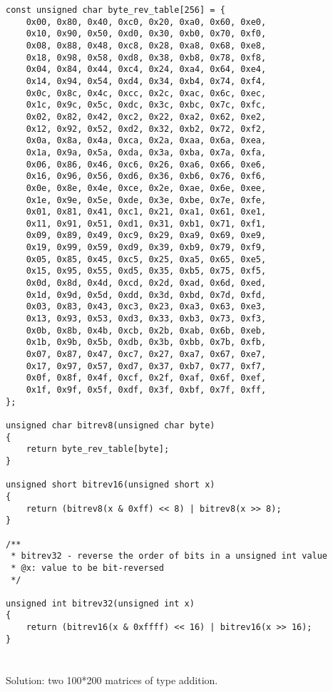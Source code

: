 \begin{lstlisting}
const unsigned char byte_rev_table[256] = {
	0x00, 0x80, 0x40, 0xc0, 0x20, 0xa0, 0x60, 0xe0,
	0x10, 0x90, 0x50, 0xd0, 0x30, 0xb0, 0x70, 0xf0,
	0x08, 0x88, 0x48, 0xc8, 0x28, 0xa8, 0x68, 0xe8,
	0x18, 0x98, 0x58, 0xd8, 0x38, 0xb8, 0x78, 0xf8,
	0x04, 0x84, 0x44, 0xc4, 0x24, 0xa4, 0x64, 0xe4,
	0x14, 0x94, 0x54, 0xd4, 0x34, 0xb4, 0x74, 0xf4,
	0x0c, 0x8c, 0x4c, 0xcc, 0x2c, 0xac, 0x6c, 0xec,
	0x1c, 0x9c, 0x5c, 0xdc, 0x3c, 0xbc, 0x7c, 0xfc,
	0x02, 0x82, 0x42, 0xc2, 0x22, 0xa2, 0x62, 0xe2,
	0x12, 0x92, 0x52, 0xd2, 0x32, 0xb2, 0x72, 0xf2,
	0x0a, 0x8a, 0x4a, 0xca, 0x2a, 0xaa, 0x6a, 0xea,
	0x1a, 0x9a, 0x5a, 0xda, 0x3a, 0xba, 0x7a, 0xfa,
	0x06, 0x86, 0x46, 0xc6, 0x26, 0xa6, 0x66, 0xe6,
	0x16, 0x96, 0x56, 0xd6, 0x36, 0xb6, 0x76, 0xf6,
	0x0e, 0x8e, 0x4e, 0xce, 0x2e, 0xae, 0x6e, 0xee,
	0x1e, 0x9e, 0x5e, 0xde, 0x3e, 0xbe, 0x7e, 0xfe,
	0x01, 0x81, 0x41, 0xc1, 0x21, 0xa1, 0x61, 0xe1,
	0x11, 0x91, 0x51, 0xd1, 0x31, 0xb1, 0x71, 0xf1,
	0x09, 0x89, 0x49, 0xc9, 0x29, 0xa9, 0x69, 0xe9,
	0x19, 0x99, 0x59, 0xd9, 0x39, 0xb9, 0x79, 0xf9,
	0x05, 0x85, 0x45, 0xc5, 0x25, 0xa5, 0x65, 0xe5,
	0x15, 0x95, 0x55, 0xd5, 0x35, 0xb5, 0x75, 0xf5,
	0x0d, 0x8d, 0x4d, 0xcd, 0x2d, 0xad, 0x6d, 0xed,
	0x1d, 0x9d, 0x5d, 0xdd, 0x3d, 0xbd, 0x7d, 0xfd,
	0x03, 0x83, 0x43, 0xc3, 0x23, 0xa3, 0x63, 0xe3,
	0x13, 0x93, 0x53, 0xd3, 0x33, 0xb3, 0x73, 0xf3,
	0x0b, 0x8b, 0x4b, 0xcb, 0x2b, 0xab, 0x6b, 0xeb,
	0x1b, 0x9b, 0x5b, 0xdb, 0x3b, 0xbb, 0x7b, 0xfb,
	0x07, 0x87, 0x47, 0xc7, 0x27, 0xa7, 0x67, 0xe7,
	0x17, 0x97, 0x57, 0xd7, 0x37, 0xb7, 0x77, 0xf7,
	0x0f, 0x8f, 0x4f, 0xcf, 0x2f, 0xaf, 0x6f, 0xef,
	0x1f, 0x9f, 0x5f, 0xdf, 0x3f, 0xbf, 0x7f, 0xff,
};

unsigned char bitrev8(unsigned char byte)
{
	return byte_rev_table[byte];
}

unsigned short bitrev16(unsigned short x)
{
	return (bitrev8(x & 0xff) << 8) | bitrev8(x >> 8);
}

/**
 * bitrev32 - reverse the order of bits in a unsigned int value
 * @x: value to be bit-reversed
 */

unsigned int bitrev32(unsigned int x)
{
	return (bitrev16(x & 0xffff) << 16) | bitrev16(x >> 16);
}
\end{lstlisting}

\section{}

{Solution: two 100*200 matrices of \Tdouble type addition.}

